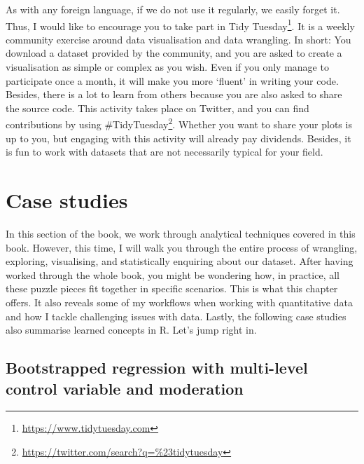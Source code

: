 \documentclass[
  letterpaper,
]{krantz}
\renewcommand{\href}[2]{#2\footnote{\url{#1}}}
\begin{document}
As with any foreign language, if we do not use it regularly, we easily
forget it. Thus, I would like to encourage you to take part in
\href{https://www.tidytuesday.com}{Tidy Tuesday}. It is a weekly
community exercise around data visualisation and data wrangling. In
short: You download a dataset provided by the community, and you are
asked to create a visualisation as simple or complex as you wish. Even
if you only manage to participate once a month, it will make you more
`fluent' in writing your code. Besides, there is a lot to learn from
others because you are also asked to share the source code. This
activity takes place on Twitter, and you can find contributions by using
\href{https://twitter.com/search?q=\%23tidytuesday}{\#TidyTuesday}.
Whether you want to share your plots is up to you, but engaging with
this activity will already pay dividends. Besides, it is fun to work
with datasets that are not necessarily typical for your field.


\chapter{Case studies}\label{sec-case-studies}

In this section of the book, we work through analytical techniques
covered in this book. However, this time, I will walk you through the
entire process of wrangling, exploring, visualising, and statistically
enquiring about our dataset. After having worked through the whole book,
you might be wondering how, in practice, all these puzzle pieces fit
together in specific scenarios. This is what this chapter offers. It
also reveals some of my workflows when working with quantitative data
and how I tackle challenging issues with data. Lastly, the following
case studies also summarise learned concepts in R. Let's jump right in.

\section{Bootstrapped regression with multi-level control variable and
moderation}\label{sec-case-study-bootstrapped-regression}
\end{document}
